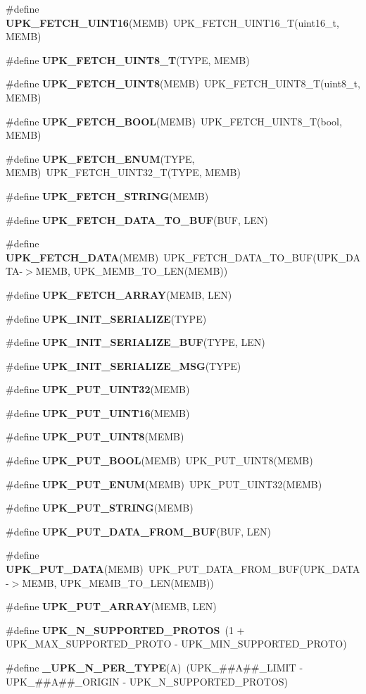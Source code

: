 \begin{DoxyCompactItemize}
\#define {\bf UPK\_\-FETCH\_\-UINT16}(MEMB)~UPK\_\-FETCH\_\-UINT16\_\-T(uint16\_\-t, MEMB)
\item 
\#define {\bf UPK\_\-FETCH\_\-UINT8\_\-T}(TYPE, MEMB)
\item 
\#define {\bf UPK\_\-FETCH\_\-UINT8}(MEMB)~UPK\_\-FETCH\_\-UINT8\_\-T(uint8\_\-t, MEMB)
\item 
\#define {\bf UPK\_\-FETCH\_\-BOOL}(MEMB)~UPK\_\-FETCH\_\-UINT8\_\-T(bool, MEMB)
\item 
\#define {\bf UPK\_\-FETCH\_\-ENUM}(TYPE, MEMB)~UPK\_\-FETCH\_\-UINT32\_\-T(TYPE, MEMB)
\item 
\#define {\bf UPK\_\-FETCH\_\-STRING}(MEMB)
\item 
\#define {\bf UPK\_\-FETCH\_\-DATA\_\-TO\_\-BUF}(BUF, LEN)
\item 
\#define {\bf UPK\_\-FETCH\_\-DATA}(MEMB)~UPK\_\-FETCH\_\-DATA\_\-TO\_\-BUF(UPK\_\-DATA-\/$>$MEMB, UPK\_\-MEMB\_\-TO\_\-LEN(MEMB))
\item 
\#define {\bf UPK\_\-FETCH\_\-ARRAY}(MEMB, LEN)
\item 
\#define {\bf UPK\_\-INIT\_\-SERIALIZE}(TYPE)
\item 
\#define {\bf UPK\_\-INIT\_\-SERIALIZE\_\-BUF}(TYPE, LEN)
\item 
\#define {\bf UPK\_\-INIT\_\-SERIALIZE\_\-MSG}(TYPE)
\item 
\#define {\bf UPK\_\-PUT\_\-UINT32}(MEMB)
\item 
\#define {\bf UPK\_\-PUT\_\-UINT16}(MEMB)
\item 
\#define {\bf UPK\_\-PUT\_\-UINT8}(MEMB)
\item 
\#define {\bf UPK\_\-PUT\_\-BOOL}(MEMB)~UPK\_\-PUT\_\-UINT8(MEMB)
\item 
\#define {\bf UPK\_\-PUT\_\-ENUM}(MEMB)~UPK\_\-PUT\_\-UINT32(MEMB)
\item 
\#define {\bf UPK\_\-PUT\_\-STRING}(MEMB)
\item 
\#define {\bf UPK\_\-PUT\_\-DATA\_\-FROM\_\-BUF}(BUF, LEN)
\item 
\#define {\bf UPK\_\-PUT\_\-DATA}(MEMB)~UPK\_\-PUT\_\-DATA\_\-FROM\_\-BUF(UPK\_\-DATA-\/$>$MEMB, UPK\_\-MEMB\_\-TO\_\-LEN(MEMB))
\item 
\#define {\bf UPK\_\-PUT\_\-ARRAY}(MEMB, LEN)
\item 
\#define {\bf UPK\_\-N\_\-SUPPORTED\_\-PROTOS}~(1 + UPK\_\-MAX\_\-SUPPORTED\_\-PROTO -\/ UPK\_\-MIN\_\-SUPPORTED\_\-PROTO)
\item 
\#define {\bf \_\-UPK\_\-N\_\-PER\_\-TYPE}(A)~(UPK\_\-\#\#A\#\#\_\-LIMIT -\/ UPK\_\-\#\#A\#\#\_\-ORIGIN -\/ UPK\_\-N\_\-SUPPORTED\_\-PROTOS)

\end{DoxyCompactItemize}
